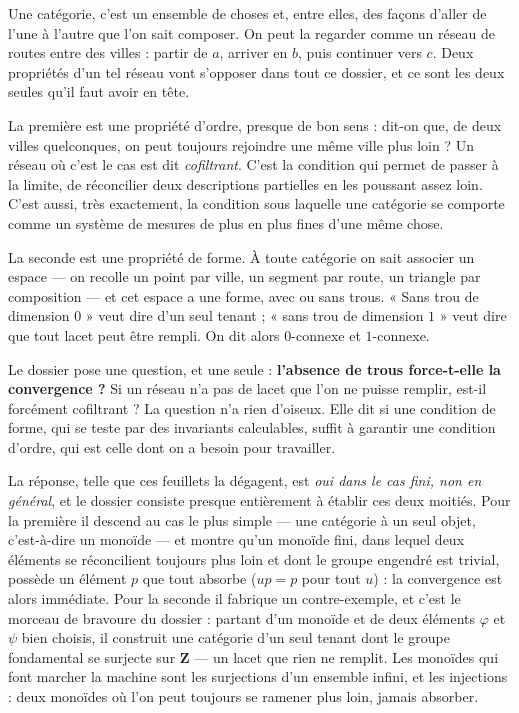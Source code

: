 \documentclass[11pt,a4paper]{article}
\begin{document}
\begin{resume}
Une catégorie, c'est un ensemble de choses et, entre elles, des façons
d'aller de l'une à l'autre que l'on sait composer. On peut la regarder comme
un réseau de routes entre des villes : partir de $a$, arriver en $b$, puis
continuer vers $c$. Deux propriétés d'un tel réseau vont s'opposer dans tout
ce dossier, et ce sont les deux seules qu'il faut avoir en tête.

La première est une propriété d'ordre, presque de bon sens : dit-on que, de
deux villes quelconques, on peut toujours rejoindre une même ville plus loin ?
Un réseau où c'est le cas est dit \emph{cofiltrant}. C'est la condition qui
permet de passer à la limite, de réconcilier deux descriptions partielles en
les poussant assez loin. C'est aussi, très exactement, la condition sous
laquelle une catégorie se comporte comme un système de mesures de plus en plus
fines d'une même chose.

La seconde est une propriété de forme. À toute catégorie on sait associer un
espace — on recolle un point par ville, un segment par route, un triangle par
composition — et cet espace a une forme, avec ou sans trous. « Sans trou de
dimension $0$ » veut dire d'un seul tenant ; « sans trou de dimension $1$ »
veut dire que tout lacet peut être rempli. On dit alors $0$-connexe et
$1$-connexe.

Le dossier pose une question, et une seule : \textbf{l'absence de trous
force-t-elle la convergence ?} Si un réseau n'a pas de lacet que l'on ne
puisse remplir, est-il forcément cofiltrant ? La question n'a rien d'oiseux.
Elle dit si une condition de forme, qui se teste par des invariants
calculables, suffit à garantir une condition d'ordre, qui est celle dont on a
besoin pour travailler.

La réponse, telle que ces feuillets la dégagent, est \emph{oui dans le cas
fini, non en général}, et le dossier consiste presque entièrement à établir
ces deux moitiés. Pour la première il descend au cas le plus simple — une
catégorie à un seul objet, c'est-à-dire un monoïde — et montre qu'un monoïde
fini, dans lequel deux éléments se réconcilient toujours plus loin et dont le
groupe engendré est trivial, possède un élément $p$ que tout absorbe
($up = p$ pour tout $u$) : la convergence est alors immédiate. Pour la
seconde il fabrique un contre-exemple, et c'est le morceau de bravoure du
dossier : partant d'un monoïde et de deux éléments $\varphi$ et $\psi$ bien
choisis, il construit une catégorie d'un seul tenant dont le groupe
fondamental se surjecte sur $\mathbf{Z}$ — un lacet que rien ne remplit. Les
monoïdes qui font marcher la machine sont les surjections d'un ensemble
infini, et les injections : deux monoïdes où l'on peut toujours se ramener
plus loin, jamais absorber.


\end{resume}
\end{document}
